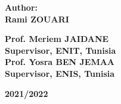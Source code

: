 \begin{titlepage}
\begin{center}
\begin{doublespacing}
        {\Large\textbf{Author:}\\}
       {\Large\textbf{Rami ZOUARI}\\}
       \vspace{2.5 mm}
       

\vspace{7 mm}
       
       {\large\textbf{Prof. Meriem JAIDANE}\\
       \textbf{Supervisor, ENIT, Tunisia}}  \\
    \vspace{3 mm}
        {\large\textbf{Prof. Yosra BEN JEMAA}\\
        	\textbf{Supervisor, ENIS, Tunisia}}
     
     \vspace{8 mm}
        
     {\large\textbf{2021/2022}}
    
    \end{doublespacing}

   \end{center}
\end{titlepage}
